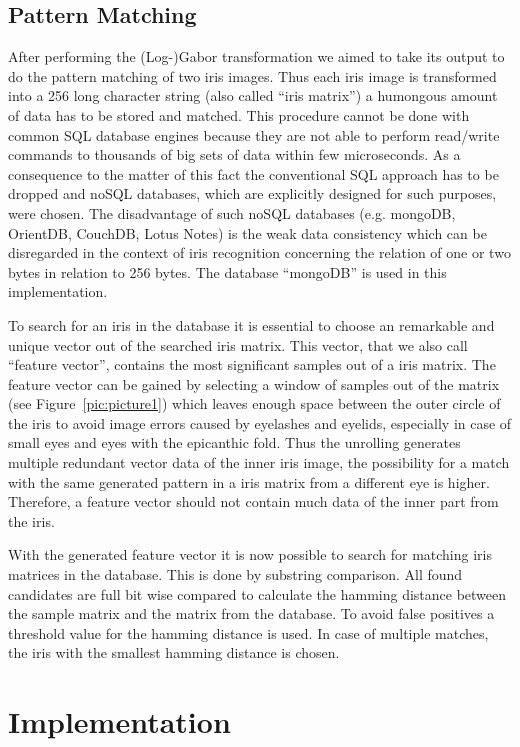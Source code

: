 \documentclass[journal]{IEEEtran}
\begin{document}
\subsection{Pattern Matching}
After performing the (Log-)Gabor transformation we aimed to take its output to do the pattern matching of two iris images. Thus each iris image is transformed into a 256 long character string (also called “iris matrix”) a humongous amount of data has to be stored and matched. This procedure cannot be done with common SQL database engines because they are not able to perform read/write commands to thousands of big sets of data within few  microseconds. As a consequence to the matter of this fact the conventional SQL approach has to be dropped and noSQL databases, which are explicitly designed for such purposes, were chosen. The disadvantage of such noSQL databases (e.g. mongoDB, OrientDB, CouchDB, Lotus Notes) is the weak data consistency which can be disregarded in the context of iris recognition concerning the relation of one or two bytes in relation to 256 bytes. The database “mongoDB” is used in this implementation.
\par To search for an iris in the database it is essential to choose an remarkable and unique vector out of the searched iris matrix. This vector, that we also call “feature vector”, contains the most significant samples out of a iris matrix. The feature vector can be gained by selecting a window of samples out of the matrix (see Figure~\ref{pic:picture1}) which leaves enough space between the outer circle of the iris to avoid image errors caused by eyelashes and eyelids, especially in case of small eyes and eyes with the epicanthic fold. Thus the unrolling generates multiple redundant vector data of the inner iris image, the possibility for a match with the same generated pattern in a iris matrix from a different eye is higher. Therefore, a feature vector should not contain much data of the inner part from the iris.
\par With the generated feature vector it is now possible to search for matching iris matrices in the database. This is done by substring comparison. All found candidates are full bit wise compared to calculate the hamming distance between the sample matrix and the matrix from the database. To avoid false positives a threshold value for the hamming distance is used. In case of multiple matches, the iris with the smallest hamming distance is chosen.

\section{Implementation}
\end{document}

